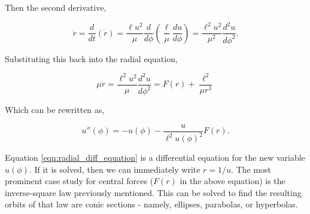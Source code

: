 Then the second derivative, 

\begin{equation*}
    \ddot{r} = \frac{d}{dt}(\dot{r}) = \frac{\ell u^2}{\mu} \frac{d}{d\phi} (\frac{\ell}{\mu} \frac{du}{d\phi}) = \frac{\ell^2 u^2}{\mu^2} \frac{d^2u}{d\phi^2}.
\end{equation*}

Substituting this back into the radial equation, 

\begin{equation*}
    \mu \ddot{r} = \frac{\ell^2 u^2}{\mu} \frac{d^2u}{d\phi^2} = F(r) + \frac{\ell^2}{\mu r^3}
\end{equation*}

Which can be rewritten as,

\begin{equation}
    u''(\phi) = -u(\phi) - \frac{u}{\ell^2 u(\phi)^2}F(r).
    \label{eqn:radial_diff_equation}
\end{equation}

Equation \ref{eqn:radial_diff_equation} is a differential equation for the new variable $u(\phi)$. If it is solved, then we can immediately write $r = 1/u$. The most prominent case study for central forces ($F(r)$ in the above equation) is the inverse-square law previously mentioned. This can be solved to find the resulting orbits of that law are conic sections - namely, ellipses, parabolas, or hyperbolas. 